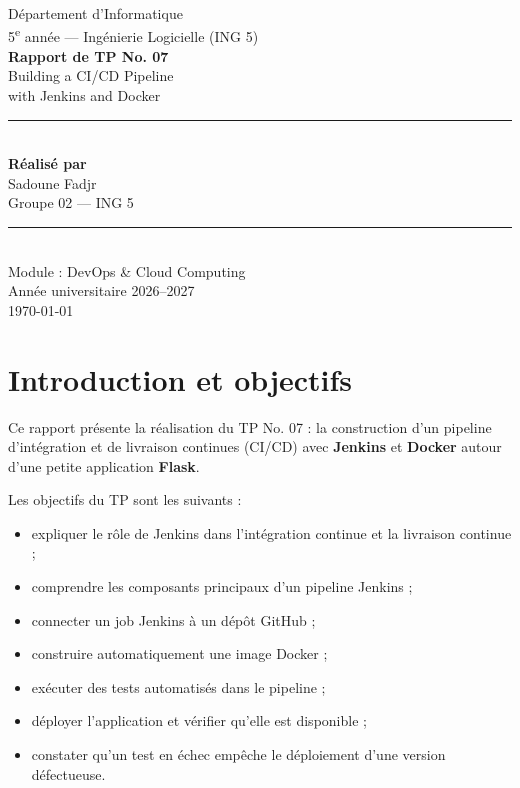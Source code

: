 \documentclass[11pt,a4paper]{article}
\begin{document}
\begin{titlepage}
\centering
\vspace*{1.2cm}
{\large Département d'Informatique}\\[0.3cm]
{\large 5\textsuperscript{e} année --- Ingénierie Logicielle (ING 5)}\\[2.0cm]

{\Huge\bfseries Rapport de TP No. 07}\\[0.6cm]
{\LARGE Building a CI/CD Pipeline\\[0.2cm] with Jenkins and Docker}\\[2.2cm]

\rule{\linewidth}{0.4pt}\\[0.6cm]
{\large\bfseries Réalisé par}\\[0.3cm]
{\Large Sadoune Fadjr}\\[0.3cm]
{\large Groupe 02 --- ING 5}\\[0.6cm]
\rule{\linewidth}{0.4pt}\\[2.0cm]

{\large Module : DevOps \& Cloud Computing}\\[3.0cm]

{\large Année universitaire 2026--2027}\\[0.3cm]
{\large \today}
\vfill
\end{titlepage}

\tableofcontents
\newpage

\section{Introduction et objectifs}

Ce rapport présente la réalisation du TP No. 07 : la construction d'un pipeline
d'intégration et de livraison continues (CI/CD) avec \textbf{Jenkins} et \textbf{Docker}
autour d'une petite application \textbf{Flask}.

Les objectifs du TP sont les suivants :
\begin{itemize}[leftmargin=1.2cm]
  \item expliquer le rôle de Jenkins dans l'intégration continue et la livraison continue ;
  \item comprendre les composants principaux d'un pipeline Jenkins ;
  \item connecter un job Jenkins à un dépôt GitHub ;
  \item construire automatiquement une image Docker ;
  \item exécuter des tests automatisés dans le pipeline ;
  \item déployer l'application et vérifier qu'elle est disponible ;
  \item constater qu'un test en échec empêche le déploiement d'une version défectueuse.
\end{itemize}
\end{document}
